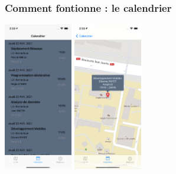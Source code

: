 \documentclass{beamer}
\begin{document}
  \begin{frame}
    \frametitle{Comment fontionne : le calendrier}
    \begin{center}
      \includegraphics[width=30mm, scale=0.5]{calendar.png}
      \includegraphics[width=30mm, scale=0.5]{calendar_position.png}
    \end{center}
  \end{frame}
\end{document}
